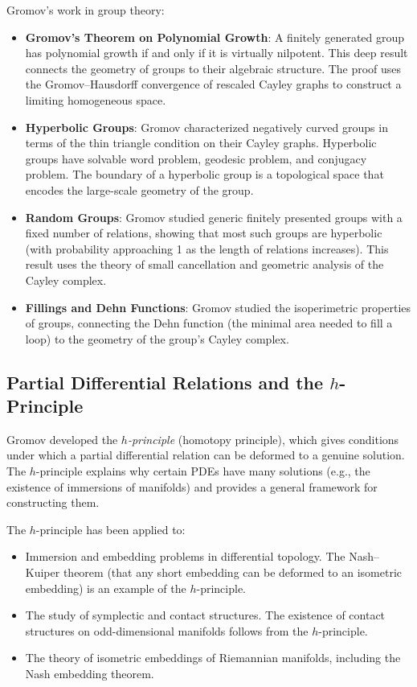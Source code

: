 Gromov's work in group theory:
\begin{itemize}
\item \textbf{Gromov's Theorem on Polynomial Growth}: A finitely generated group has polynomial growth if and only if it is virtually nilpotent. This deep result connects the geometry of groups to their algebraic structure. The proof uses the Gromov--Hausdorff convergence of rescaled Cayley graphs to construct a limiting homogeneous space.
\item \textbf{Hyperbolic Groups}: Gromov characterized negatively curved groups in terms of the thin triangle condition on their Cayley graphs. Hyperbolic groups have solvable word problem, geodesic problem, and conjugacy problem. The boundary of a hyperbolic group is a topological space that encodes the large-scale geometry of the group.
\item \textbf{Random Groups}: Gromov studied generic finitely presented groups with a fixed number of relations, showing that most such groups are hyperbolic (with probability approaching 1 as the length of relations increases). This result uses the theory of small cancellation and geometric analysis of the Cayley complex.
\item \textbf{Fillings and Dehn Functions}: Gromov studied the isoperimetric properties of groups, connecting the Dehn function (the minimal area needed to fill a loop) to the geometry of the group's Cayley complex.
\end{itemize}

\subsection{Partial Differential Relations and the \texorpdfstring{$h$}{h}-Principle}

Gromov developed the \emph{$h$-principle} (homotopy principle), which gives conditions under which a partial differential relation can be deformed to a genuine solution. The $h$-principle explains why certain PDEs have many solutions (e.g., the existence of immersions of manifolds) and provides a general framework for constructing them.

The $h$-principle has been applied to:
\begin{itemize}
\item Immersion and embedding problems in differential topology. The Nash--Kuiper theorem (that any short embedding can be deformed to an isometric embedding) is an example of the $h$-principle.
\item The study of symplectic and contact structures. The existence of contact structures on odd-dimensional manifolds follows from the $h$-principle.
\item The theory of isometric embeddings of Riemannian manifolds, including the Nash embedding theorem.
\end{itemize}

